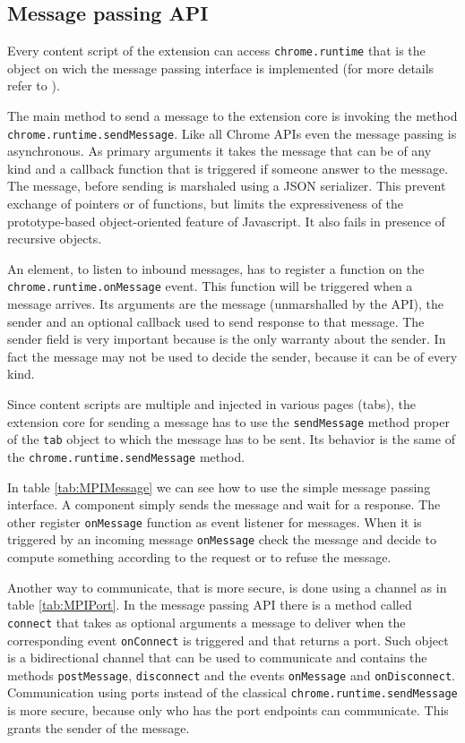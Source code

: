 \subsection{Message passing API}
\label{subs:MPI}
Every content script of the extension can access \texttt{chrome.runtime} that is the object on wich the message passing interface is implemented (for more details refer to \cite{ChromeExtensionRuntime}). 

The main method to send a message to the extension core is invoking the method \texttt{chrome.runtime.sendMessage}. Like all Chrome APIs even the message passing is asynchronous. As primary arguments it takes the message that can be of any kind and a callback function that is triggered if someone answer to the message. The message, before sending is marshaled using a JSON serializer. This prevent exchange of pointers or of functions, but limits the expressiveness of the prototype-based object-oriented feature of Javascript. It also fails in presence of recursive objects.

An element, to listen to inbound messages, has to register a function on the \texttt{chrome.runtime.onMessage} event. This function will be triggered when a message arrives. Its arguments are the message (unmarshalled by the API), the sender and an optional callback used to send response to that message. The sender field is very important because is the only warranty about the sender. In fact the message may not be used to decide the sender, because it can be of every kind.

Since content scripts are multiple and injected in various pages (tabs), the extension core for sending a message has to use the \texttt{sendMessage} method proper of the \texttt{tab} object to which the message has to be sent. Its behavior is the same of the \texttt{chrome.runtime.sendMessage} method.

In table \ref{tab:MPIMessage} we can see how to use the simple message passing interface. A component simply sends the message and wait for a response. The other register \texttt{onMessage} function as event listener for messages. When it is triggered by an incoming message \texttt{onMessage} check the message and decide to compute something according to the request or to refuse the message.

Another way to communicate, that is more secure, is done using a channel as in table \ref{tab:MPIPort}. In the message passing API there is a method called \texttt{connect} that takes as optional arguments a message to deliver  when the corresponding event \texttt{onConnect} is triggered and that returns a port. Such object is a bidirectional channel that can be used to communicate and contains the methods \texttt{postMessage}, \texttt{disconnect} and the events \texttt{onMessage} and \texttt{onDisconnect}. Communication using ports instead of the classical \texttt{chrome.runtime.sendMessage} is more secure, because only who has the port endpoints can communicate. This grants the sender of the message.

